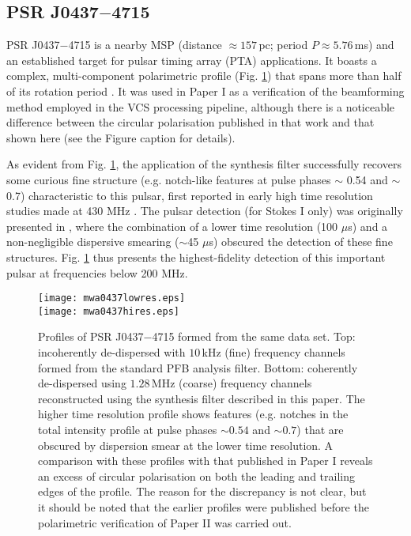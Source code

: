 \documentclass{pasa}%
\newcommand{\psrbhatJ}{J0437$-$4715}
\begin{document}
\subsection{PSR \psrbhatJ{}}

PSR \psrbhatJ{} is a nearby MSP (distance $\approx 157\,$pc; period $P \approx 5.76\,$ms) and an established target for pulsar timing array (PTA) applications.
It boasts a complex, multi-component polarimetric profile (Fig. \ref{fig:0437}) that spans more than half of its rotation period \citep[cf.][]{Yan2011}.
It was used in Paper I as a verification of the beamforming method employed in the VCS processing pipeline, although there is a noticeable difference between the circular polarisation published in that work and that shown here (see the Figure caption for details).

As evident from Fig. \ref{fig:0437}, the application of the synthesis filter successfully recovers some curious fine structure (e.g. notch-like features at pulse phases $\sim$ 0.54 and $\sim$ 0.7) characteristic to this pulsar, first reported in early high time resolution studies made at 430 MHz \citep{Navarro1997}. The pulsar detection (for Stokes I only) was originally presented in \citet{Bhat2018}, where the combination of a lower time resolution (100 $\mu$s) and a non-negligible dispersive smearing ($\sim$45 $\mu$s) obscured the detection of these fine structures. Fig. \ref{fig:0437} thus presents the highest-fidelity detection of this important pulsar at frequencies below 200 MHz.

\begin{figure}[t!]
    \centering
    \texttt{[image: mwa0437lowres.eps]} \\[10pt]
    \texttt{[image: mwa0437hires.eps]}
    \caption{Profiles of PSR \psrbhatJ{} formed from the same data set. Top: incoherently de-dispersed with $10\,$kHz (fine) frequency channels formed from the standard PFB analysis filter. Bottom: coherently de-dispersed using $1.28\,$MHz (coarse) frequency channels reconstructed using the synthesis filter described in this paper. The higher time resolution profile shows features (e.g. notches in the total intensity profile at pulse phases $\sim 0.54$ and $\sim 0.7$) that are obscured by dispersion smear at the lower time resolution. A comparison with these profiles with that published in Paper I reveals an excess of circular polarisation on both the leading and trailing edges of the profile. The reason for the discrepancy is not clear, but it should be noted that the earlier profiles were published before the polarimetric verification of Paper II was carried out.}
    \label{fig:0437}
\end{figure}
\end{document}
